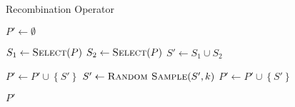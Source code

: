 \begin{algorithm}[h]
  \caption{Recombination Operator}\label{alg:GENETIKUS-ALGORITMUS:REPRODUKCIO}
  \begin{algorithmic}[1]
    \State $P' \leftarrow \emptyset$

    \State $S_{1} \leftarrow \Call{Select}{P}$
    \State $S_{2} \leftarrow \Call{Select}{P}$
    \State $S' \leftarrow S_{1} \cup S_{2}$

    \State $P' \leftarrow P' \cup \left\{ S' \right\}$
    \Else
    \State $S' \leftarrow \Call{Random Sample}{S', k}$
    \State $P' \leftarrow P' \cup \left\{ S' \right\}$
    \EndIf
    \EndFor

    \State \Return $P'$
    \EndFunction
  \end{algorithmic}
\end{algorithm}
